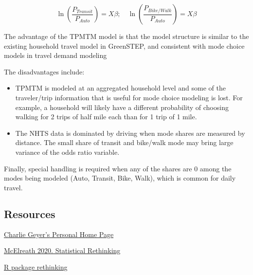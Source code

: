 \documentclass[
]{article}
\providecommand{\tightlist}{%
  \setlength{\itemsep}{0pt}\setlength{\parskip}{0pt}}
\begin{document}
\[\ln(\frac{P_{Transit}}{P_{Auto}})=X\beta;\quad \ln(\frac{P_{Bike/Walk}}{P_{Auto}})=X\beta\]

The advantage of the TPMTM model is that the model structure is similar
to the existing household travel model in GreenSTEP, and consistent with
mode choice models in travel demand modeling

The disadvantages include:

\begin{itemize}
\tightlist
\item
  TPMTM is modeled at an aggregated household level and some of the
  traveler/trip information that is useful for mode choice modeling is
  lost. For example, a household will likely have a different
  probability of choosing walking for 2 trips of half mile each than for
  1 trip of 1 mile.
\item
  The NHTS data is dominated by driving when mode shares are measured by
  distance. The small share of transit and bike/walk mode may bring
  large variance of the odds ratio variable.
\end{itemize}

Finally, special handling is required when any of the shares are 0 among
the modes being modeled (Auto, Transit, Bike, Walk), which is common for
daily travel.

\hypertarget{resources}{%
\subsection{Resources}\label{resources}}

\href{http://users.stat.umn.edu/~geyer/}{Charlie Geyer's Personal Home
Page}

\href{https://xcelab.net/rm/statistical-rethinking/}{McElreath 2020.
Statistical Rethinking}

\href{https://github.com/rmcelreath/rethinking}{R package rethinking}
\end{document}

